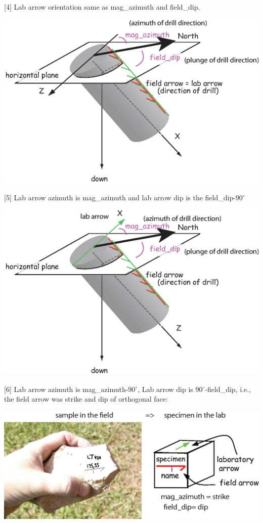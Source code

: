 \documentclass[11pt]{book}
\begin{document}
{{  [4] Lab arrow orientation same as mag\_azimuth and field\_dip.
  
        \includegraphics[width=15cm]{EPSfiles/orcon_4.eps}
        
        [5]  Lab arrow azimuth is  mag\_azimuth and lab arrow dip is the  field\_dip-90$^{\circ}$
        
               \includegraphics[width=15cm]{EPSfiles/orcon_5.eps}
               
 
 [6] Lab arrow azimuth is mag\_azimuth-90$^{\circ}$, Lab arrow dip is 90$^{\circ}$-field\_dip, i.e., the field arrow was strike and dip of orthogonal face:
 
                \includegraphics[width=15cm]{EPSfiles/orcon_6.eps}          
                } 
        
}
\end{document}
